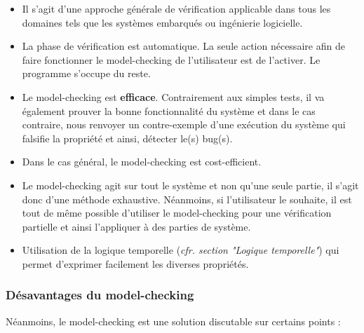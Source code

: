 \documentclass[runningheads,a4paper,11pt]{llncs}
\begin{document}
\begin{itemize}
\item Il s'agit d'une approche générale de vérification applicable dans tous les domaines tels que les systèmes embarqués ou ingénierie logicielle. 
\item La phase de vérification est automatique. La seule action nécessaire afin de faire fonctionner le model-checking de l'utilisateur est de l'activer. Le programme s'occupe du reste. 
\item Le model-checking est \textbf{efficace}. Contrairement aux simples tests, il va également prouver la bonne fonctionnalité du système et dans le cas contraire, nous renvoyer un contre-exemple d'une exécution du système qui falsifie la propriété et ainsi, détecter le(s) bug(s). 
\item Dans le cas général, le model-checking est cost-efficient. 
\item Le model-checking agit sur tout le système et non qu'une seule partie, il s'agit donc d'une méthode exhaustive. Néanmoins, si l'utilisateur le souhaite, il est tout de même possible d'utiliser le model-checking pour une vérification partielle et ainsi l'appliquer à des parties de système. 
\item Utilisation de la logique temporelle (\textit{cfr. section "Logique temporelle"}) qui permet d'exprimer facilement les diverses propriétés. 
\end{itemize}

\subsubsection{Désavantages du model-checking}

Néanmoins, le model-checking est une solution discutable sur certains points : 
\end{document}
